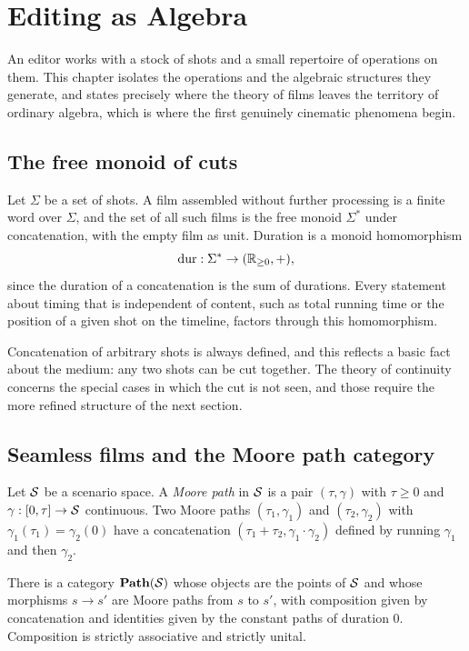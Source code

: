 \chapter{Editing as Algebra}
\label{ch:editing}

An editor works with a stock of shots and a small repertoire of operations on them. This chapter isolates the operations and the algebraic structures they generate, and states precisely where the theory of films leaves the territory of ordinary algebra, which is where the first genuinely cinematic phenomena begin.

\section{The free monoid of cuts}

Let $\Sigma$ be a set of shots. A film assembled without further processing is a finite word over $\Sigma$, and the set of all such films is the free monoid $\Sigma^*$ under concatenation, with the empty film as unit. Duration is a monoid homomorphism
\[
\operatorname{dur}:\Sigma^*\to(\mathbb{R}_{\ge0},+),
\]
since the duration of a concatenation is the sum of durations. Every statement about timing that is independent of content, such as total running time or the position of a given shot on the timeline, factors through this homomorphism.

Concatenation of arbitrary shots is always defined, and this reflects a basic fact about the medium: any two shots can be cut together. The theory of continuity concerns the special cases in which the cut is not seen, and those require the more refined structure of the next section.

\section{Seamless films and the Moore path category}

Let $\mathcal{S}$ be a scenario space. A \emph{Moore path} in $\mathcal{S}$ is a pair $(\tau,\gamma)$ with $\tau\ge0$ and $\gamma:[0,\tau]\to\mathcal{S}$ continuous. Two Moore paths $(\tau_1,\gamma_1)$ and $(\tau_2,\gamma_2)$ with $\gamma_1(\tau_1)=\gamma_2(0)$ have a concatenation $(\tau_1+\tau_2,\gamma_1\cdot\gamma_2)$ defined by running $\gamma_1$ and then $\gamma_2$.

\begin{proposition}\label{prop:moore}
There is a category $\mathbf{Path}(\mathcal{S})$ whose objects are the points of $\mathcal{S}$ and whose morphisms $s\to s'$ are Moore paths from $s$ to $s'$, with composition given by concatenation and identities given by the constant paths of duration $0$. Composition is strictly associative and strictly unital.
\end{proposition}

